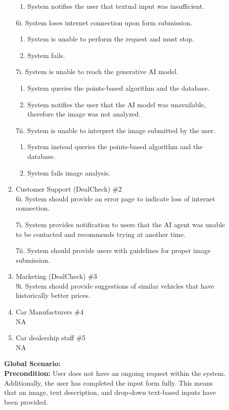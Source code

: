 \documentclass[]{article}
\begin{document}
\begin{enumerate}
\begin{enumerate}[{\bf {BE}1.}]
\begin{enumerate}[{\bf VP1.}]
\begin{enumerate}[{5i}.1]
			\item System notifies the user that textual input was insufficient.
		\end{enumerate}
		6i. System loses internet connection upon form submission.
		\begin{enumerate}[{6i}.1]
			\item System is unable to perform the request and must stop.
			\item System fails.
		\end{enumerate}
		7i. System is unable to reach the generative AI model.
		\begin{enumerate}[{7i}.1]
			\item System queries the points-based algorithm and the database.
			\item System notifies the user that the AI model was unavailable, therefore the image was not analyzed.
		\end{enumerate}
		7ii. System is unable to interpret the image submitted by the user.
		\begin{enumerate}[{7ii}.1]
			\item System instead queries the points-based algorithm and the database.
			\item System fails image analysis.
		\end{enumerate}
		\item Customer Support (DealCheck) \#2 \\
			6i. System should provide an error page to indicate loss of internet connection.

			7i. System provides notification to users that the AI agent was unable to be contacted and recommends trying at another time.
			
			7ii. System should provide users with guidelines for proper image submission.
		\item Marketing (DealCheck) \#3 \\
			9i. System should provide suggestions of similar vehicles that have historically better prices.
		\item Car Manufacturers \#4 \\
			NA
		\item Car dealership staff \#5 \\
			NA
	\end{enumerate}
	{\bf Global Scenario:}\\
	{\bf Precondition:} User does not have an ongoing request within the system. Additionally, 
	the user has completed the input form fully. This means that an image, 
	text description, and drop-down text-based inputs have been provided.


\end{enumerate}
\end{enumerate}
\end{document}
